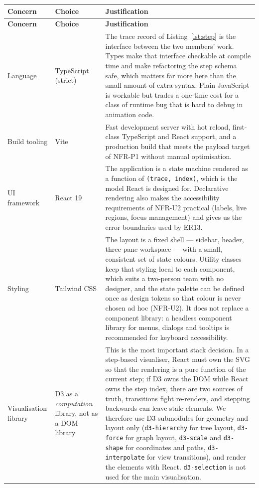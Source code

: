 \documentclass[11pt,a4paper]{article}
\newcommand{\ct}[1]{\texttt{#1}}
\begin{document}
{\footnotesize
\setlength{\tabcolsep}{4pt}
\begin{longtable}{@{}L{3.1cm}L{2.9cm}L{8.6cm}@{}}
\toprule
\textbf{Concern} & \textbf{Choice} & \textbf{Justification} \\
\midrule
\endfirsthead
\toprule
\textbf{Concern} & \textbf{Choice} & \textbf{Justification} \\
\midrule
\endhead
\bottomrule
\endlastfoot

Language & TypeScript (strict) &
The trace record of Listing~\ref{lst:step} is the interface between the two members' work. Types make
that interface checkable at compile time and make refactoring the step schema safe, which
matters far more here than the small amount of extra syntax. Plain JavaScript is
workable but trades a one-time cost for a class of runtime bug that is hard to debug in
animation code. \\

Build tooling & Vite &
Fast development server with hot reload, first-class TypeScript and React support, and a
production build that meets the payload target of NFR-P1 without manual optimisation. \\

UI framework & React 19 &
The application is a state machine rendered as a function of \ct{(trace, index)}, which is
the model React is designed for. Declarative rendering also makes the accessibility
requirements of NFR-U2 practical (labels, live regions, focus management) and gives us the
error boundaries used by ER13. \\

Styling & Tailwind CSS &
The layout is a fixed shell --- sidebar, header, three-pane workspace --- with a small,
consistent set of state colours. Utility classes keep that styling local to each component,
which suits a two-person team with no designer, and the state palette can be defined once as
design tokens so that colour is never chosen ad hoc (NFR-U2). It does not replace a
component library: a headless component library for menus, dialogs and tooltips is
recommended for keyboard accessibility. \\

Visualisation library & D3 as a \emph{computation} library, not as a DOM library &
This is the most important stack decision. In a step-based visualiser, React must own the
SVG so that the rendering is a pure function of the current step; if D3 owns the DOM while
React owns the step index, there are two sources of truth, transitions fight re-renders, and
stepping backwards can leave stale elements. We therefore use D3 submodules for geometry and
layout only (\ct{d3-hierarchy} for tree layout, \ct{d3-force} for graph layout,
\ct{d3-scale} and \ct{d3-shape} for coordinates and paths, \ct{d3-interpolate} for view
transitions), and render the elements with React. \ct{d3-selection} is not used for the main
visualisation. \\


\end{longtable}}
\end{document}

